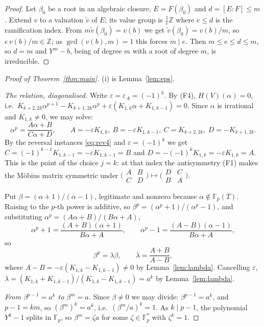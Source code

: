 \documentclass[11pt]{amsart}
\theoremstyle{remark}
\newcommand{\Fp}{\mathbb F_p}
\newcommand{\Kc}[2]{K_{#1,#2}}
\newcommand{\HV}{H(V)}
\begin{document}
\begin{proof}
Let $\beta_0$ be a root in an algebraic closure, $E=F(\beta_0)$ and $d=[E:F]\le m$. Extend $v$ to a
valuation $\widetilde v$ of $E$; its value group is $\frac1e\mathbb Z$ where $e\le d$ is the
ramification index. From $m\widetilde v(\beta_0)=v(b)$ we get $\widetilde v(\beta_0)=v(b)/m$, so
$e\,v(b)/m\in\mathbb Z$; as $\gcd(v(b),m)=1$ this forces $m\mid e$. Then $m\le e\le d\le m$, so
$d=m$ and $Y^m-b$, being of degree $m$ with a root of degree $m$, is irreducible.
\end{proof}

\begin{proof}[Proof of Theorem~\ref{thm:main}]
(i) is Lemma~\ref{lem:eps}.

\emph{The relation, diagonalised.} Write $\varepsilon=\varepsilon_A=(-1)^k$. By (F4),
$\HV(\alpha)=0$, i.e.\ $\Kc{k+2}{2k}\alpha^{p+1}-\Kc{k+1}{2k}\alpha^p
+\varepsilon(\Kc1k\alpha+\Kc1{k-1})=0$. Since $\alpha$ is irrational and $\Kc1k\ne0$, we may solve:
\[
 \alpha^p=\frac{A\alpha+B}{C\alpha+D},\qquad
 A=-\varepsilon\Kc1k,\ B=-\varepsilon\Kc1{k-1},\ C=\Kc{k+2}{2k},\ D=-\Kc{k+1}{2k}.
\]
By the reversal instances \eqref{eq:rev4} and $\varepsilon=(-1)^k$ we get
$C=(-1)^{k-1}\Kc1{k-1}=-\varepsilon\Kc1{k-1}=B$
and $D=-(-1)^k\Kc1k=-\varepsilon\Kc1k=A$. This is the point of the choice $j=k$: at that index the
antisymmetry (F1) makes the M\"obius matrix symmetric under
$\bigl(\begin{smallmatrix}A&B\\C&D\end{smallmatrix}\bigr)\mapsto
\bigl(\begin{smallmatrix}D&C\\B&A\end{smallmatrix}\bigr)$.

Put $\beta=(\alpha+1)/(\alpha-1)$, legitimate and nonzero because $\alpha\notin\Fp(T)$. Raising to
the $p$-th power is additive, so $\beta^p=(\alpha^p+1)/(\alpha^p-1)$, and substituting
$\alpha^p=(A\alpha+B)/(B\alpha+A)$,
\[
 \alpha^p+1=\frac{(A+B)(\alpha+1)}{B\alpha+A},\qquad
 \alpha^p-1=\frac{(A-B)(\alpha-1)}{B\alpha+A},
\]
so
\[
 \beta^p=\lambda\beta,\qquad \lambda=\frac{A+B}{A-B},
\]
where $A-B=-\varepsilon(\Kc1k-\Kc1{k-1})\ne0$ by Lemma~\ref{lem:lambda}. Cancelling
$\varepsilon$, $\lambda=(\Kc1k+\Kc1{k-1})/(\Kc1k-\Kc1{k-1})=a^k$ by Lemma~\ref{lem:lambda}.

\emph{From $\beta^{p-1}=a^k$ to $\beta^m=a$.} Since $\beta\ne0$ we may divide:
$\beta^{p-1}=a^k$, and $p-1=km$, so $(\beta^m)^k=a^k$, i.e.\ $(\beta^m/a)^k=1$. As $k\mid p-1$, the
polynomial $Y^k-1$ splits in $\Fp$, so $\beta^m=\zeta a$ for some $\zeta\in\Fp^*$ with
$\zeta^k=1$.


\end{proof}
\end{document}
